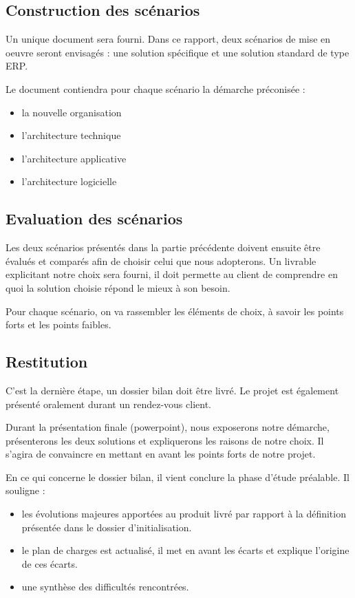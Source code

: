 \subsection{Construction des scénarios}

Un unique document sera fourni. Dans ce rapport, deux scénarios de mise en oeuvre seront envisagés : une solution spécifique et une solution standard de type ERP.

Le document contiendra pour chaque scénario la démarche préconisée :
\begin{itemize}
    \item la nouvelle organisation
    \item l’architecture technique
    \item l’architecture applicative
    \item l’architecture logicielle
\end{itemize}
\subsection{Evaluation des scénarios}

Les deux scénarios présentés dans la partie précédente doivent ensuite être évalués et comparés afin de choisir celui que nous adopterons. Un livrable explicitant notre choix sera fourni, il doit permette au client de comprendre en quoi la solution choisie répond le mieux à son besoin.

Pour chaque scénario, on va rassembler les éléments de choix, à savoir les points forts et les points faibles.


\subsection{Restitution}

C’est la dernière étape, un dossier bilan doit être livré. Le projet est également présenté oralement durant un rendez-vous client.

Durant la présentation finale (powerpoint), nous exposerons notre démarche, présenterons les deux solutions et expliquerons les raisons de notre choix. Il s’agira de convaincre en mettant en avant les points forts de notre projet.

En ce qui concerne le dossier bilan, il vient conclure la phase d’étude préalable. Il souligne :
\begin{itemize}
    \item les évolutions majeures apportées au produit livré par rapport à la définition présentée dans le dossier d’initialisation.
    \item le plan de charges est actualisé, il met en avant les écarts et explique l’origine de ces écarts.
    \item une  synthèse des difficultés rencontrées.
\end{itemize}

